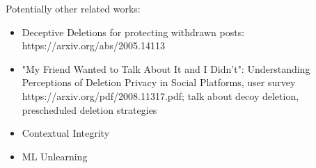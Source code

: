 Potentially other related works:
\begin{itemize}
    \item Deceptive Deletions for protecting withdrawn posts: https://arxiv.org/abs/2005.14113
    \item "My Friend Wanted to Talk About It and I Didn't": Understanding Perceptions of
        Deletion Privacy in Social Platforms, user survey https://arxiv.org/pdf/2008.11317.pdf;
        talk about decoy deletion, prescheduled deletion strategies~\cite{myfw}
    \item Contextual Integrity
    \item ML Unlearning
\end{itemize}

